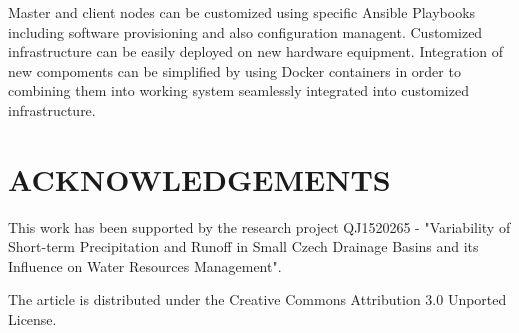 \documentclass{isprs}
\begin{document}
Master and client nodes can be customized using specific Ansible
Playbooks including software provisioning and also configuration
managent. Customized infrastructure can be easily deployed on new
hardware equipment. Integration of new compoments can be simplified by
using Docker containers in order to combining them into working system
seamlessly integrated into customized infrastructure.

{%
  \begin{spacing}{0.9}%
     
  \end{spacing}
}

\section*{ACKNOWLEDGEMENTS}\label{ACKNOWLEDGEMENTS}

This work has been supported by the research project QJ1520265 -
"Variability of Short-term Precipitation and Runoff in Small Czech
Drainage Basins and its Influence on Water Resources Management".

The article is distributed under the Creative Commons Attribution 3.0
Unported License.
\end{document}
